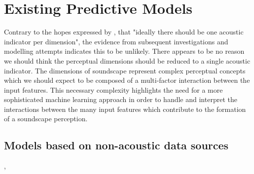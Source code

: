 
\section{Existing Predictive Models}

Contrary to the hopes expressed by \citet{Aletta2014Towards}, that "ideally there should be one acoustic indicator per dimension", the evidence from subsequent investigations and modelling attempts \citep{Lionello2020systematic} indicates this to be unlikely. There appears to be no reason we should think the perceptual dimensions should be reduced to a single acoustic indicator. The dimensions of soundscape represent complex perceptual concepts which we should expect to be composed of a multi-factor interaction between the input features. This necessary complexity  highlights the need for a more sophisticated machine learning approach in order to handle and interpret the interactions between the many input features which contribute to the formation of a soundscape perception.
\citep{Aletta2016Soundscape}

\citep{Lionello2020systematic}

\subsection{Models based on non-acoustic data sources}

\citep{Verma2020Predicting}, \citep{Gasco2020Social}
